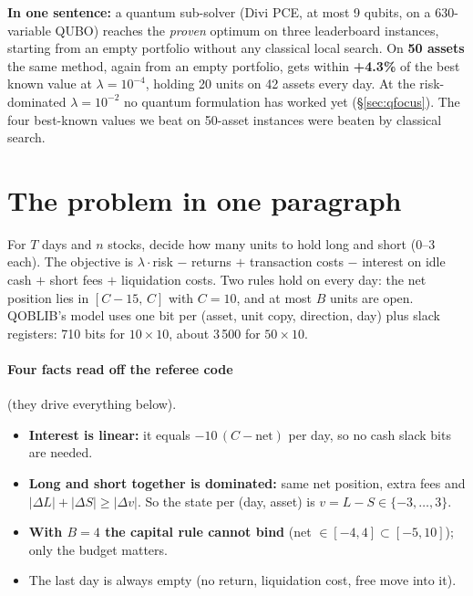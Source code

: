 \documentclass[11pt]{article}
\begin{document}
\noindent\textbf{In one sentence:} a quantum sub-solver (Divi PCE, at most 9 qubits, on a 630-variable
QUBO) reaches the \emph{proven} optimum on three leaderboard instances, starting from an empty
portfolio without any classical local search. On \textbf{50 assets} the same method, again from an
empty portfolio, gets within \textbf{+4.3\%} of the best known value at $\lambda=10^{-4}$, holding
20 units on 42 assets every day. At the risk-dominated $\lambda=10^{-2}$ no quantum formulation has
worked yet (\S\ref{sec:qfocus}). The four best-known values we beat on 50-asset instances were
beaten by classical search.

\section{The problem in one paragraph}
For $T$ days and $n$ stocks, decide how many units to hold long and short (0--3 each). The objective
is $\lambda\cdot$risk $-$ returns $+$ transaction costs $-$ interest on idle cash $+$ short fees $+$
liquidation costs. Two rules hold on every day: the net position lies in $[C-15,\,C]$ with $C=10$,
and at most $B$ units are open. QOBLIB's model uses one bit per (asset, unit copy, direction, day)
plus slack registers: 710 bits for $10\times10$, about 3\,500 for $50\times10$.

\paragraph{Four facts read off the referee code} (they drive everything below).
\begin{itemize}
\item \textbf{Interest is linear:} it equals $-10\,(C-\text{net})$ per day, so no cash slack bits are needed.
\item \textbf{Long and short together is dominated:} same net position, extra fees and
  $|\Delta L|+|\Delta S|\ge|\Delta v|$. So the state per (day, asset) is $v=L-S\in\{-3,\dots,3\}$.
\item \textbf{With $B=4$ the capital rule cannot bind} (net $\in[-4,4]\subset[-5,10]$); only the budget matters.
\item The last day is always empty (no return, liquidation cost, free move into it).
\end{itemize}

\end{document}
